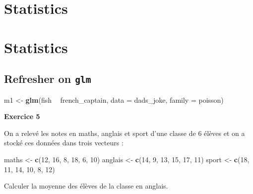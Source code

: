 \documentclass[
  12pt,
]{book}
\newenvironment{Shaded}{\begin{snugshade}}{\end{snugshade}}
\newcommand{\DataTypeTok}[1]{\textcolor[rgb]{0.13,0.29,0.53}{#1}}
\newcommand{\DecValTok}[1]{\textcolor[rgb]{0.00,0.00,0.81}{#1}}
\newcommand{\KeywordTok}[1]{\textcolor[rgb]{0.13,0.29,0.53}{\textbf{#1}}}
\newcommand{\NormalTok}[1]{#1}
\newcommand{\OperatorTok}[1]{\textcolor[rgb]{0.81,0.36,0.00}{\textbf{#1}}}
\newcommand{\StringTok}[1]{\textcolor[rgb]{0.31,0.60,0.02}{#1}}
\begin{document}
\hypertarget{part-statistics}{%
\part{Statistics}\label{part-statistics}}

\hypertarget{part-statistics-1}{%
\part{Statistics}\label{part-statistics-1}}

\hypertarget{refresher-on-glm}{%
\chapter{\texorpdfstring{Refresher on \texttt{glm}}{Refresher on glm}}\label{refresher-on-glm}}

\begin{Shaded}
\begin{Highlighting}[]
\NormalTok{m1 <-}\StringTok{ }\KeywordTok{glm}\NormalTok{(fish }\OperatorTok{~}\StringTok{ }\NormalTok{french_captain, }\DataTypeTok{data =}\NormalTok{ dads_joke, }\DataTypeTok{family =}\NormalTok{ poisson)}
\end{Highlighting}
\end{Shaded}

\textbf{Exercice 5}

On a relevé les notes en maths, anglais et sport d'une classe de 6 élèves et on a stocké ces données dans trois vecteurs :

\begin{Shaded}
\begin{Highlighting}[]
\NormalTok{maths <-}\StringTok{ }\KeywordTok{c}\NormalTok{(}\DecValTok{12}\NormalTok{, }\DecValTok{16}\NormalTok{, }\DecValTok{8}\NormalTok{, }\DecValTok{18}\NormalTok{, }\DecValTok{6}\NormalTok{, }\DecValTok{10}\NormalTok{)}
\NormalTok{anglais <-}\StringTok{ }\KeywordTok{c}\NormalTok{(}\DecValTok{14}\NormalTok{, }\DecValTok{9}\NormalTok{, }\DecValTok{13}\NormalTok{, }\DecValTok{15}\NormalTok{, }\DecValTok{17}\NormalTok{, }\DecValTok{11}\NormalTok{)}
\NormalTok{sport <-}\StringTok{ }\KeywordTok{c}\NormalTok{(}\DecValTok{18}\NormalTok{, }\DecValTok{11}\NormalTok{, }\DecValTok{14}\NormalTok{, }\DecValTok{10}\NormalTok{, }\DecValTok{8}\NormalTok{, }\DecValTok{12}\NormalTok{)}
\end{Highlighting}
\end{Shaded}

Calculer la moyenne des élèves de la classe en anglais.
\end{document}
